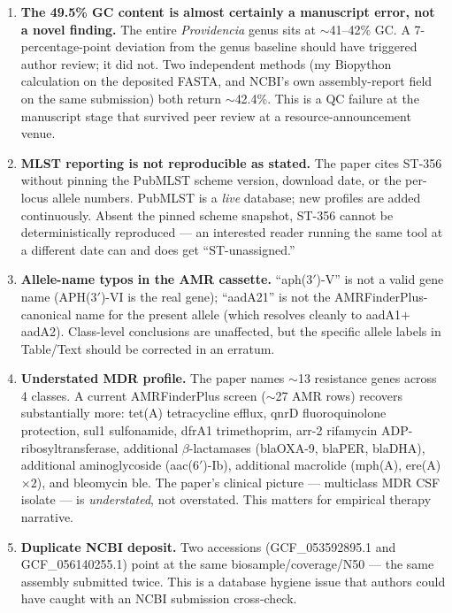 \documentclass[11pt]{article}
\begin{document}
\begin{enumerate}
  \item \textbf{The 49.5\% GC content is almost certainly a manuscript error, not a novel finding.}
  The entire \textit{Providencia} genus sits at $\sim$41--42\% GC. A 7-percentage-point deviation
  from the genus baseline should have triggered author review; it did not. Two independent
  methods (my Biopython calculation on the deposited FASTA, and NCBI's own assembly-report
  field on the same submission) both return $\sim$42.4\%. This is a QC failure at the manuscript
  stage that survived peer review at a resource-announcement venue.

  \item \textbf{MLST reporting is not reproducible as stated.} The paper cites ST-356 without pinning
  the PubMLST scheme version, download date, or the per-locus allele numbers. PubMLST is a
  \emph{live} database; new profiles are added continuously. Absent the pinned scheme snapshot,
  ST-356 cannot be deterministically reproduced --- an interested reader running the same tool
  at a different date can and does get ``ST-unassigned.''

  \item \textbf{Allele-name typos in the AMR cassette.} ``aph(3$'$)-V'' is not a valid gene name
  (APH(3$'$)-VI is the real gene); ``aadA21'' is not the AMRFinderPlus-canonical name for the
  present allele (which resolves cleanly to aadA1$+$aadA2). Class-level conclusions are
  unaffected, but the specific allele labels in Table/Text should be corrected in an erratum.

  \item \textbf{Understated MDR profile.} The paper names $\sim$13 resistance genes across 4 classes.
  A current AMRFinderPlus screen ($\sim$27 AMR rows) recovers substantially more: tet(A) tetracycline
  efflux, qnrD fluoroquinolone protection, sul1 sulfonamide, dfrA1 trimethoprim, arr-2
  rifamycin ADP-ribosyltransferase, additional $\beta$-lactamases (blaOXA-9, blaPER, blaDHA),
  additional aminoglycoside (aac(6$'$)-Ib), additional macrolide (mph(A), ere(A) $\times 2$),
  and bleomycin ble. The paper's clinical picture --- multiclass MDR CSF isolate --- is
  \emph{understated}, not overstated. This matters for empirical therapy narrative.

  \item \textbf{Duplicate NCBI deposit.} Two accessions (GCF\_053592895.1 and GCF\_056140255.1) point
  at the same biosample/coverage/N50 --- the same assembly submitted twice. This is a database
  hygiene issue that authors could have caught with an NCBI submission cross-check.


\end{enumerate}
\end{document}
